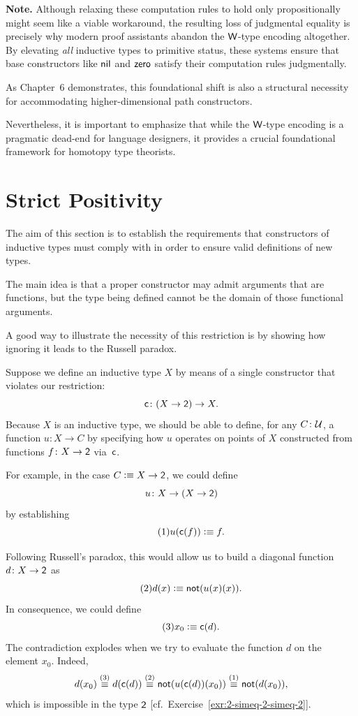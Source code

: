 \medskip

\textbf{Note.} Although relaxing these computation rules to hold only propositionally might seem like a viable workaround, the resulting loss of judgmental equality is precisely why modern proof assistants abandon the\/ $\mathsf{W}$-type encoding altogether. By elevating \textit{all} inductive types to primitive status, these systems ensure that base constructors like $\mathsf{nil}$ and $\mathsf{zero}$ satisfy their computation rules judgmentally.

As Chapter~6 demonstrates, this foundational shift is also a structural necessity for accommodating higher-dimensional path constructors.

Nevertheless, it is important to emphasize that while the\/ $\mathsf{W}$-type encoding is a pragmatic dead-end for language designers, it provides a crucial foundational framework for homotopy type theorists.

\section{Strict Positivity}

The aim of this section is to establish the requirements that constructors of inductive types must comply with in order to ensure valid definitions of new types.

The main idea is that a proper constructor may admit arguments that are functions, but the type being defined cannot be the domain of those functional arguments.

A good way to illustrate the necessity of this restriction is by showing how ignoring it leads to the Russell paradox.

Suppose we define an inductive type $X$ by means of a single constructor that violates our restriction:
\[
    \fun c\colon(X\to\fun2)\to X.
\]
Because $X$ is an inductive type, we should be able to define, for any $C\colon\univ$, a function $u\colon X\to C$ by specifying how $u$ operates on points of $X$ constructed from functions $f\colon X\to\fun2$ via~$\mathsf{c}$.

For example, in the case $C\mathrel{\vcentcolon}\equiv X\to\mathsf{2}$, we could define
\[
    u\colon X\to(X\to\fun2)
\]
by establishing
\[\tag{$1$}
    u(\mathsf{c}(f))\mathrel{\vcentcolon}\equiv f.
\]

Following Russell's paradox, this would allow us to build a diagonal function $d\colon X\to\fun2$ as
\[\tag{$2$}
    d(x)\mathrel{\vcentcolon}\equiv\mathsf{not}(u(x)(x)).
\]
In consequence, we could define
\[\tag{$3$}
    x_0\mathrel{\vcentcolon}\equiv\mathsf{c}(d).
\]
The contradiction explodes when we try to evaluate the function $d$ on the element $x_0$. Indeed,
\[
    d(x_0)
        \stackrel{(3)}\equiv d(\mathsf{c}(d))
        \stackrel{(2)}\equiv\mathsf{not}(u(\mathsf{c}(d))(x_0))
        \stackrel{(1)}\equiv\mathsf{not}(d(x_0)),
\]
which is impossible in the type $\mathsf{2}$ [cf.~Exercise~\ref{exr:2-simeq-2-simeq-2}].

